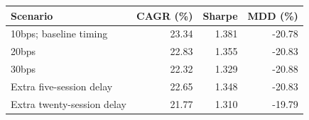 \begin{tabular}{lrrr}
\toprule
Scenario & CAGR (\%) & Sharpe & MDD (\%) \\
\midrule
10bps; baseline timing & 23.34 & 1.381 & -20.78 \\
20bps & 22.83 & 1.355 & -20.83 \\
30bps & 22.32 & 1.329 & -20.88 \\
Extra five-session delay & 22.65 & 1.348 & -20.83 \\
Extra twenty-session delay & 21.77 & 1.310 & -19.79 \\
\bottomrule
\end{tabular}
